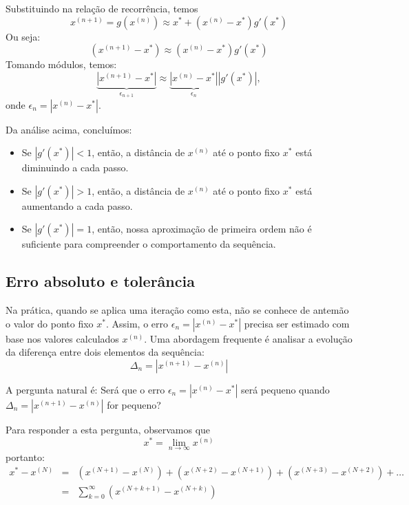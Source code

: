 Substituindo na relação de recorrência, temos
\begin{equation}
x^{(n+1)}=g\left(x^{(n)}\right)\approx x^*+(x^{(n)}-x^*) g'(x^*)
\end{equation}
Ou seja:
\begin{equation}
\left(x^{(n+1)}-x^*\right)\approx {(x^{(n)}-x^*)} g'(x^*)
\end{equation}
Tomando módulos, temos:
\begin{equation}
\underbrace{\left|x^{(n+1)}-x^*\right|}_{\epsilon_{n+1}}\approx \underbrace{\left|x^{(n)}-x^*\right|}_{\epsilon_n} \left|g'(x^*)\right|,
\end{equation}
onde $\epsilon_n=\left|x^{(n)}-x^*\right|$.

\begin{obs} Da análise acima, concluímos:
\begin{itemize}
\item Se $|g'(x^*)|<1$, então, a distância de $x^{(n)}$ até o ponto fixo $x^*$ está diminuindo a cada passo.
\item Se $|g'(x^*)|>1$, então, a distância de $x^{(n)}$ até o ponto fixo $x^*$ está aumentando a cada passo.
\item Se $|g'(x^*)|=1$, então, nossa aproximação de primeira ordem não é suficiente para compreender o comportamento da sequência.
\end{itemize}
\end{obs}

\subsection{Erro absoluto e tolerância}

Na prática, quando se aplica uma iteração como esta, não se conhece de antemão o valor do ponto fixo $x^*$. Assim, o erro $\epsilon_n=\left|x^{(n)}-x^*\right|$ precisa ser estimado com base nos valores calculados $x^{(n)}$. Uma abordagem frequente é analisar a evolução da diferença entre dois elementos da sequência:
\begin{equation} \Delta_n=\left|x^{(n+1)}-x^{(n)}\right| \end{equation}

A pergunta natural é: Será que o erro $\epsilon_n=\left|x^{(n)}-x^*\right|$ será pequeno quando  $\Delta_n=\left|x^{(n+1)}-x^{(n)}\right|$ for pequeno?

Para responder a esta pergunta, observamos que
\begin{equation} x^*=\lim_{n\to \infty }x^{(n)} \end{equation}
portanto:
\begin{eqnarray}
x^*-x^{(N)}&=&  \left(x^{(N+1)}-x^{(N)}\right)+\left(x^{(N+2)}-x^{(N+1)}\right)+\left(x^{(N+3)}-x^{(N+2)}\right)+\ldots\\
&=&\sum_{k=0}^\infty \left(x^{(N+k+1)}-x^{(N+k)}\right)
\end{eqnarray}

